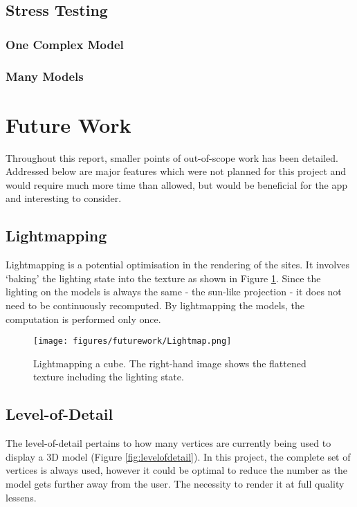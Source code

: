 \documentclass{article}
\begin{document}
\subsection{Stress Testing}

\subsubsection{One Complex Model}

\subsubsection{Many Models}

\section{Future Work}
\label{futurework}
Throughout this report, smaller points of out-of-scope work has been detailed. Addressed below are major features which were not planned for this project and would require much more time than allowed, but would be beneficial for the app and interesting to consider.

\subsection{Lightmapping}
Lightmapping is a potential optimisation in the rendering of the sites. It involves `baking' the lighting state into the texture as shown in Figure \ref{fig:lightmapping}. Since the lighting on the models is always the same - the sun-like projection - it does not need to be continuously recomputed. By lightmapping the models, the computation is performed only once.

\begin{figure}
\centering
    \texttt{[image: figures/futurework/Lightmap.png]}
        \caption{Lightmapping a cube. The right-hand image shows the flattened texture including the lighting state. \cite{futurework:lightmapping}}
        \label{fig:lightmapping}
\end{figure}

\subsection{Level-of-Detail}
The level-of-detail pertains to how many vertices are currently being used to display a 3D model (Figure \ref{fig:levelofdetail}). In this project, the complete set of vertices is always used, however it could be optimal to reduce the number as the model gets further away from the user. The necessity to render it at full quality lessens. 
\end{document}
